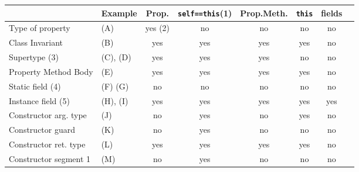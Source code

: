 \begin{tabular}{||l|l|c|c|c|c|c|c||} 
\hline
~
  & {\bf Example}
  & {\bf Prop.}
  & {\bf {\tt \small self==this}(1)}
  & {\bf Prop.Meth.}
  & {\bf {\tt this}}
  & {\bf {fields}}
\\\hline
Type of property 
  & (A) 
  & %
    yes (2)
  & no %
  & no %
  & no %
  & no %
\\\hline
Class Invariant
  & (B) 
  & yes %
  & yes %
  & yes %
  & yes %
  & no %
\\\hline
Supertype (3)
  & (C), (D)
  & yes%
  & yes%
  & yes%
  & no%
  & no%
\\\hline
Property Method Body
  & (E) 
  & yes %
  & yes %
  & yes %
  & yes %
  & no %
\\\hline

Static field (4)
  & (F) (G) 
  & no %
  & no %
  & no %
  & no %
  & no %
\\\hline

Instance field (5)
  & (H), (I) 
  & yes %
  & yes %
  & yes %
  & yes %
  & yes %
\\\hline

Constructor arg. type
  & (J) 
  & no %
  & yes %
  & no  %
  & yes %
  & no %
\\\hline

Constructor guard
  & (K) 
  & no %
  & yes %
  & no %
  & no %
  & no %
\\\hline

Constructor ret. type
  & (L) 
  & yes %
  & yes %
  & yes %
  & yes %
  & no %
\\\hline

Constructor segment 1 
  & (M) 
  & no%
  & yes%
  & no%
  & no%
  & no%
\\\hline



\end{tabular}
